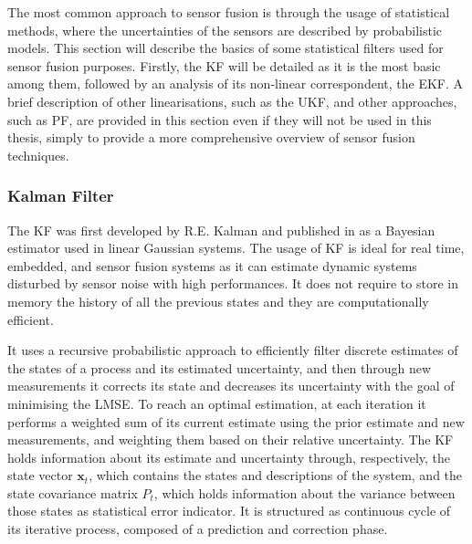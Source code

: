 The most common approach to sensor fusion is through the usage of statistical methods, where the uncertainties of the sensors are described by probabilistic models\cite{gustafsson_statistical_2010}.
This section will describe the basics of some statistical filters used for sensor fusion purposes.
Firstly, the \gls{KF} will be detailed as it is the most basic among them, followed by an analysis of its non-linear correspondent, the \gls{EKF}. A brief description of other linearisations, such as the \gls{UKF}, and other approaches, such as \gls{PF}, are provided in this section even if they will not be used in this thesis, simply to provide a more comprehensive overview of sensor fusion techniques.

\subsubsection{Kalman Filter}

\noindent The \gls{KF} was first developed by R.E. Kalman and published in \cite{kalman} as a Bayesian estimator used in linear Gaussian systems.
The usage of \gls{KF} is ideal for real time, embedded, and sensor fusion systems as it can estimate dynamic systems disturbed by sensor noise with high performances.
It does not require to store in memory the history of all the previous states and they are computationally efficient.

It uses a recursive probabilistic approach to efficiently filter discrete estimates of the states of a process and its estimated uncertainty, and then through new measurements it corrects its state and decreases its uncertainty with the goal of minimising the \gls{LMSE}.
To reach an optimal estimation, at each iteration it performs a weighted sum of its current estimate using the prior estimate and new measurements, and weighting them based on their relative uncertainty.
The \gls{KF} holds information about its estimate and uncertainty through, respectively, the state vector $\mathbf{x}_t$, which contains the states and descriptions of the system, and the state covariance matrix $P_t$,  which holds information about the variance between those states as statistical error indicator.
It is structured as continuous cycle of its iterative process, composed of a prediction and correction phase.

